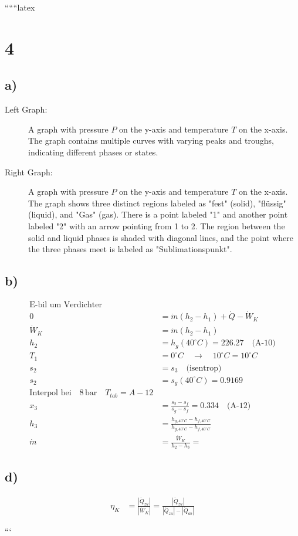 
``````latex


\section*{4}

\subsection*{a)}

\begin{description}
    \item[Left Graph:] A graph with pressure \( P \) on the y-axis and temperature \( T \) on the x-axis. The graph contains multiple curves with varying peaks and troughs, indicating different phases or states.
    \item[Right Graph:] A graph with pressure \( P \) on the y-axis and temperature \( T \) on the x-axis. The graph shows three distinct regions labeled as "fest" (solid), "flüssig" (liquid), and "Gas" (gas). There is a point labeled "1" and another point labeled "2" with an arrow pointing from 1 to 2. The region between the solid and liquid phases is shaded with diagonal lines, and the point where the three phases meet is labeled as "Sublimationspunkt".
\end{description}

\subsection*{b)}

\begin{align*}
\text{E-bil um Verdichter} \\
0 &= \dot{m} (h_2 - h_1) + \dot{Q} - \dot{W}_K \\
\dot{W}_K &= \dot{m} (h_2 - h_1) \\
h_2 &= h_g (40^\circ C) = 226.27 \quad \text{(A-10)} \\
T_1 &= 0^\circ C \quad \rightarrow \quad 10^\circ C = 10^\circ C \\
s_2 &= s_3 \quad \text{(isentrop)} \\
s_2 &= s_g (40^\circ C) = 0.9169 \\
\text{Interpol bei} \quad 8 \, \text{bar} \quad T_{tab} = A-12 \\
x_3 &= \frac{s_2 - s_f}{s_g - s_f} = 0.334 \quad \text{(A-12)} \\
h_3 &= \frac{h_{g,40^\circ C} - h_{f,40^\circ C}}{h_{g,40^\circ C} - h_{f,40^\circ C}} \\
\dot{m} &= \frac{\dot{W}_K}{h_2 - h_3} = 
\end{align*}

\subsection*{d)}

\begin{align*}
\eta_K &= \frac{\left| \dot{Q}_{zu} \right|}{\left| \dot{W}_K \right|} = \frac{\left| \dot{Q}_{zu} \right|}{\left| \dot{Q}_{zu} \right| - \left| \dot{Q}_{ab} \right|}
\end{align*}

```